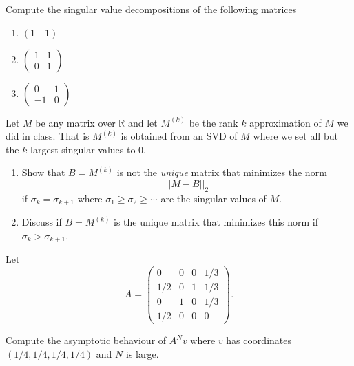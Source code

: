   \begin{exercise} 
    Compute the singular value decompositions of the following matrices
    \begin{enumerate}
      \item $(1 \quad 1)$
      
      \item $\begin{pmatrix} 1 & 1 \\ 0 & 1 \end{pmatrix}$
      
      \item $\begin{pmatrix} 0 & 1 \\ -1 & 0 \end{pmatrix}$
    \end{enumerate}
  \end{exercise}

  \begin{exercise} 
    Let $M$ be any matrix over $\mathbb{R}$ and let $M^{(k)}$ be the rank $k$ approximation of $M$ we did in class. That is $M^{(k)}$ is obtained from an SVD of $M$ where we set all but the $k$ largest singular values to 0.
    \begin{enumerate}
      \item Show that $B = M^{(k)}$ is not the \textit{unique} matrix that minimizes the norm
      \[||M-B||_2\]
      if $\sigma_k = \sigma_{k+1}$ where $\sigma_1 \geq \sigma_2 \geq \cdots$ are the singular values of $M$.
      
      \item Discuss if $B = M^{(k)}$ is the unique matrix that minimizes this norm if $\sigma_k > \sigma_{k+1}$.
    \end{enumerate}
  \end{exercise}

  \begin{exercise} 
    Let
    \[A = \begin{pmatrix} 
      0 & 0 & 0 & 1/3 \\
      1/2 & 0 & 1 & 1/3 \\
      0 & 1 & 0 & 1/3 \\
      1/2 & 0 & 0 & 0
    \end{pmatrix}.\]
    
    Compute the asymptotic behaviour of $A^N v$ where $v$ has coordinates $(1/4, 1/4, 1/4, 1/4)$ and $N$ is large.
  \end{exercise}

